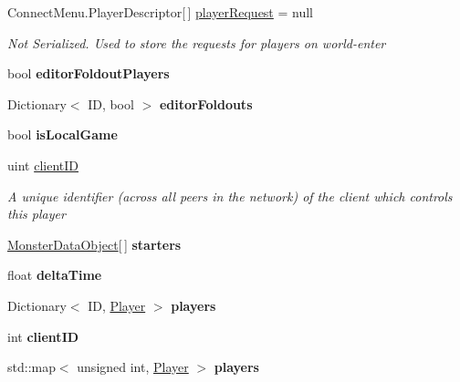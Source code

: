 \begin{DoxyCompactItemize}
\item 
Connect\-Menu.\-Player\-Descriptor\mbox{[}$\,$\mbox{]} \hyperlink{class_game_state_a8b1949523ac8e40776c0617666023d64}{player\-Request} = null
\begin{DoxyCompactList}\small\item\em Not Serialized. Used to store the requests for players on world-\/enter \end{DoxyCompactList}\item 
\hypertarget{class_game_state_ad68ed3f1f32060bfff68d296e6750712}{bool {\bfseries editor\-Foldout\-Players}}\label{class_game_state_ad68ed3f1f32060bfff68d296e6750712}

\item 
\hypertarget{class_game_state_a47358e83d829da7a28c49f8d0a795125}{Dictionary$<$ I\-D, bool $>$ {\bfseries editor\-Foldouts}}\label{class_game_state_a47358e83d829da7a28c49f8d0a795125}

\item 
\hypertarget{class_game_state_aa4cba70bc38a13e80439dc784c6ca12e}{bool {\bfseries is\-Local\-Game}}\label{class_game_state_aa4cba70bc38a13e80439dc784c6ca12e}

\item 
uint \hyperlink{class_game_state_ad24a423ba6655fc6541b2f12ce98e0d0}{client\-I\-D}
\begin{DoxyCompactList}\small\item\em A unique identifier (across all peers in the network) of the client which controls this player \end{DoxyCompactList}\item 
\hypertarget{class_game_state_a3d88394849f2356b1c1917f8bb9cc873}{\hyperlink{class_monster_data_object}{Monster\-Data\-Object}\mbox{[}$\,$\mbox{]} {\bfseries starters}}\label{class_game_state_a3d88394849f2356b1c1917f8bb9cc873}

\item 
\hypertarget{class_game_state_a857eed8c97274c3dd9d3eb558a33f855}{float {\bfseries delta\-Time}}\label{class_game_state_a857eed8c97274c3dd9d3eb558a33f855}

\item 
\hypertarget{class_game_state_aed9c4cf83c497c6e36585e0ed3999564}{Dictionary$<$ I\-D, \hyperlink{class_game_state_1_1_player}{Player} $>$ {\bfseries players}}\label{class_game_state_aed9c4cf83c497c6e36585e0ed3999564}

\item 
\hypertarget{class_game_state_adb8c9c7f10d683332cbd62927d35cb35}{int {\bfseries client\-I\-D}}\label{class_game_state_adb8c9c7f10d683332cbd62927d35cb35}

\item 
\hypertarget{class_game_state_a8f156a6cce5f2b9945c274b6bfc971ce}{std\-::map$<$ unsigned int, \hyperlink{class_game_state_1_1_player}{Player} $>$ {\bfseries players}}\label{class_game_state_a8f156a6cce5f2b9945c274b6bfc971ce}

\end{DoxyCompactItemize}

